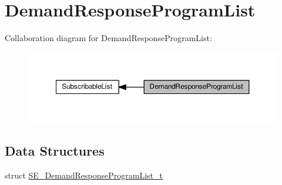 \hypertarget{group__DemandResponseProgramList}{}\section{Demand\+Response\+Program\+List}
\label{group__DemandResponseProgramList}
Collaboration diagram for Demand\+Response\+Program\+List\+:\nopagebreak
\begin{figure}[H]
\begin{center}
\leavevmode
\includegraphics[width=350pt]{group__DemandResponseProgramList}
\end{center}
\end{figure}
\subsection*{Data Structures}
\begin{DoxyCompactItemize}
\item 
struct \hyperlink{structSE__DemandResponseProgramList__t}{S\+E\+\_\+\+Demand\+Response\+Program\+List\+\_\+t}
\end{DoxyCompactItemize}
